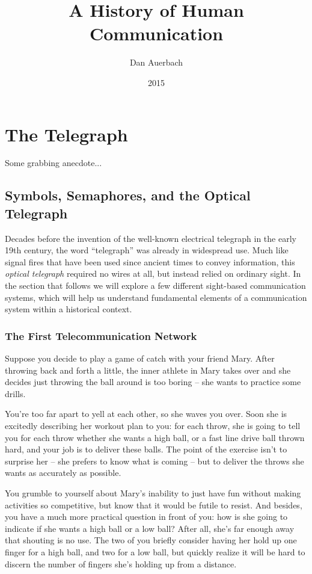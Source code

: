 \documentclass{book}
\begin{document}
\title{A History of Human Communication}
\author{Dan Auerbach}
\date{2015}
\maketitle

\part{The Telegraph}

Some grabbing anecdote...

\chapter{Symbols, Semaphores, and the Optical Telegraph}

Decades before the invention of the well-known electrical telegraph in the early 19th century, the word ``telegraph'' was already in widespread use. Much like signal fires that have been used since ancient times to convey information, this \emph{optical telegraph} required no wires at all, but instead relied on ordinary sight. In the section that follows we will explore a few different sight-based communication systems, which will help us understand fundamental elements of a communication system within a historical context.

\section{The First Telecommunication Network}

Suppose you decide to play a game of catch with your friend Mary. After throwing back and forth a little, the inner athlete in Mary takes over and she decides just throwing the ball around is too boring -- she wants to practice some drills.

You're too far apart to yell at each other, so she waves you over. Soon she is excitedly describing her workout plan to you: for each throw, she is going to tell you for each throw whether she wants a high ball, or a fast line drive ball thrown hard, and your job is to deliver these balls. The point of the exercise isn't to surprise her -- she prefers to know what is coming -- but to deliver the throws she wants as accurately as possible.

You grumble to yourself about Mary's inability to just have fun without making activities so competitive, but know that it would be futile to resist. And besides, you have a much more practical question in front of you: how is she going to indicate if she wants a high ball or a low ball? After all, she's far enough away that shouting is no use. The two of you briefly consider having her hold up one finger for a high ball, and two for a low ball, but quickly realize it will be hard to discern the number of fingers she's holding up from a distance.
\end{document}
